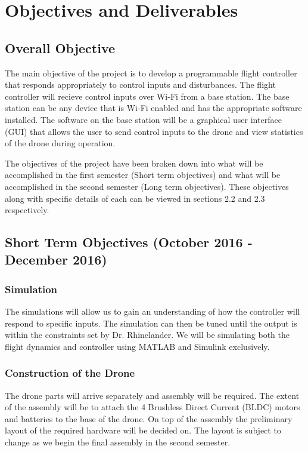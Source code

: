 \section{Objectives and Deliverables}
\subsection{Overall Objective}
The main objective of the project is to develop a programmable flight controller that responds appropriately to control inputs and disturbances. The flight controller will recieve control inputs over Wi-Fi from a base station. The base station can be any device that is Wi-Fi enabled and has the appropriate software installed. The software on the base station will be a graphical user interface (GUI) that allows the user to send control inputs to the drone and view statistics of the drone during operation. 

The objectives of the project have been broken down into what will be accomplished in the first semester (Short term objectives) and what will be accomplished in the second semester (Long term objectives). These objectives along with specific details of each can be viewed in sections 2.2 and 2.3 respectively.  

\subsection{Short Term Objectives (October 2016 - December 2016)}
\subsubsection{Simulation}

The simulations will allow us to gain an understanding of how the controller will respond to specific inputs. The simulation can then be tuned until the output is within the constraints set by Dr. Rhinelander. We will be simulating both the flight dynamics and controller using MATLAB and Simulink exclusively.

\subsubsection{Construction of the Drone}

The drone parts will arrive separately and assembly will be required. The extent of the assembly will be to attach the 4 Brushless Direct Current (BLDC) motors and batteries to the base of the drone. On top of the assembly the preliminary layout of the required hardware will be decided on. The layout is subject to change as we begin the final assembly in the second semester. 

